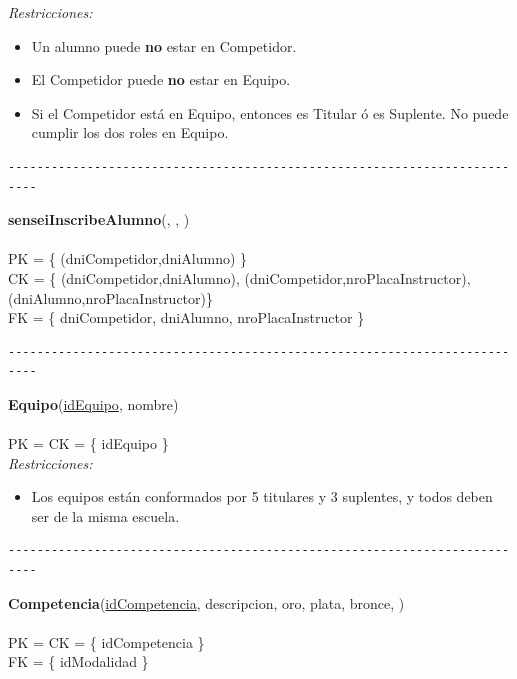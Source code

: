\textit{Restricciones:}
\begin{itemize}
	\item Un alumno puede \textbf{no} estar en Competidor.
	\item El Competidor puede \textbf{no} estar en Equipo.
	\item Si el Competidor está en Equipo, entonces es Titular ó es Suplente. No puede cumplir los dos roles en Equipo.
\end{itemize}


\begin{verbatim}
--------------------------------------------------------------------------
\end{verbatim}

\noindent\textbf{senseiInscribeAlumno}(, , )
\\
\\
PK = \{ (dniCompetidor,dniAlumno) \} \\
CK = \{ (dniCompetidor,dniAlumno), (dniCompetidor,nroPlacaInstructor), (dniAlumno,nroPlacaInstructor)\} \\
FK = \{ dniCompetidor, dniAlumno, nroPlacaInstructor \} \\


\begin{verbatim}
--------------------------------------------------------------------------
\end{verbatim}

\noindent\textbf{Equipo}(\uline{idEquipo}, nombre)
\\
\\
PK = CK = \{ idEquipo \} \\

\textit{Restricciones:}
\begin{itemize}
	\item Los equipos están conformados por 5 titulares y 3 suplentes, y todos deben ser de la misma escuela.
\end{itemize}


\begin{verbatim}
--------------------------------------------------------------------------
\end{verbatim}

\noindent\textbf{Competencia}(\uline{idCompetencia}, descripcion, oro, plata, bronce, )
\\
\\
PK = CK = \{ idCompetencia \} \\
FK = \{ idModalidad \} \\

